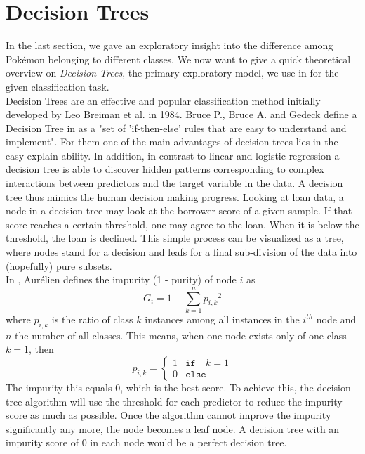 \documentclass[conference]{IEEEtran}
\begin{document}
\section{Decision Trees}
\label{sec:decision}
In the last section, we gave an exploratory insight into the difference among Pokémon belonging to different classes. We now want to give a quick theoretical overview on \textit{Decision Trees}, the primary exploratory model, we use in for the given classification task.\\
Decision Trees are an effective and popular classification method initially developed by Leo Breiman et al. \cite{breiman84} in 1984. Bruce P., Bruce A. and Gedeck define a Decision Tree in \cite[p. 250]{bruce17} as a "set of 'if-then-else' rules that are easy to understand and implement". For them one of the main advantages of decision trees lies in the easy explain-ability. In addition, in contrast to linear and logistic regression a decision tree is able to discover hidden patterns corresponding to complex interactions between predictors and the target variable in the data. A decision tree thus mimics the human decision making progress. Looking at loan data, a node in a decision tree may look at the borrower score of a given sample. If that score reaches a certain threshold, one may agree to the loan. When it is below the threshold, the loan is declined. This simple process can be visualized as a tree, where nodes stand for a decision and leafs for a final sub-division of the data into (hopefully) pure subsets.\\
In \cite{aurelien19}, Aurélien defines the impurity (1 - purity) of node $i$ as
\begin{equation}
	G_i = 1 - \sum_{k = 1}^{n} {p_{i, k}}^2
\end{equation}
where $p_{i, k}$ is the ratio of class $k$ instances among all instances in the $i^{th}$ node and $n$ the number of all classes. This means, when one node exists only of one class $k = 1$, then
\begin{equation}
	p_{i, k} =\begin{cases}
		1 & \mathtt{if} \quad k = 1 \\
		0 & \mathtt{else}
	\end{cases}
\end{equation}
The impurity this equals $0$, which is the best score. To achieve this, the decision tree algorithm will use the threshold for each predictor to reduce the impurity score as much as possible. Once the algorithm cannot improve the impurity significantly any more, the node becomes a leaf node. A decision tree with an impurity score of $0$ in each node would be a perfect decision tree.\\
\end{document}
